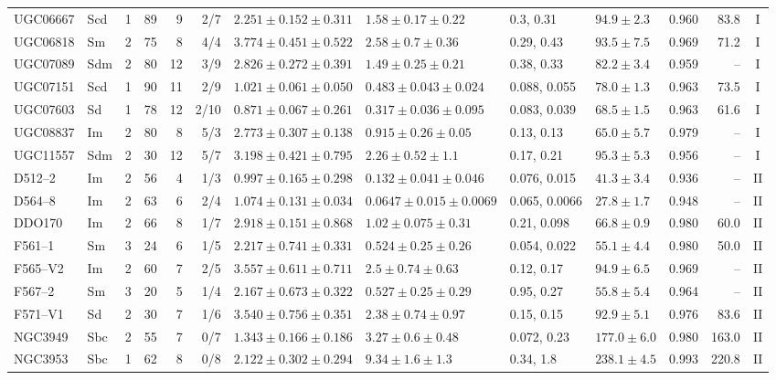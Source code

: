 \documentclass[10pt]{article}
\begin{document}
\begin{landscape}
{\begin{longtable}{llrrrrlllllrc}
UGC06667 & Scd & 1 & 89 & 9 & 2/7 & $2.251\pm0.152\pm0.311$ & $1.58\pm0.17\pm0.22$ & 0.3, 0.31 & $94.9\pm2.3$ & 0.960 & 83.8 & I\\
UGC06818 & Sm & 2 & 75 & 8 & 4/4 & $3.774\pm0.451\pm0.522$ & $2.58\pm0.7\pm0.36$ & 0.29, 0.43 & $93.5\pm7.5$ & 0.969 & 71.2 & I\\
UGC07089 & Sdm & 2 & 80 & 12 & 3/9 & $2.826\pm0.272\pm0.391$ & $1.49\pm0.25\pm0.21$ & 0.38, 0.33 & $82.2\pm3.4$ & 0.959 & -- & I\\
UGC07151 & Scd & 1 & 90 & 11 & 2/9 & $1.021\pm0.061\pm0.050$ & $0.483\pm0.043\pm0.024$ & 0.088, 0.055 & $78.0\pm1.3$ & 0.963 & 73.5 & I\\
UGC07603 & Sd & 1 & 78 & 12 & 2/10 & $0.871\pm0.067\pm0.261$ & $0.317\pm0.036\pm0.095$ & 0.083, 0.039 & $68.5\pm1.5$ & 0.963 & 61.6 & I\\
UGC08837 & Im & 2 & 80 & 8 & 5/3 & $2.773\pm0.307\pm0.138$ & $0.915\pm0.26\pm0.05$ & 0.13, 0.13 & $65.0\pm5.7$ & 0.979 & -- & I\\
UGC11557 & Sdm & 2 & 30 & 12 & 5/7 & $3.198\pm0.421\pm0.795$ & $2.26\pm0.52\pm1.1$ & 0.17, 0.21 & $95.3\pm5.3$ & 0.956 & -- & I\\
D512--2 & Im & 2 & 56 & 4 & 1/3 & $0.997\pm0.165\pm0.298$ & $0.132\pm0.041\pm0.046$ & 0.076, 0.015 & $41.3\pm3.4$ & 0.936 & -- & II\\
D564--8 & Im & 2 & 63 & 6 & 2/4 & $1.074\pm0.131\pm0.034$ & $0.0647\pm0.015\pm0.0069$ & 0.065, 0.0066 & $27.8\pm1.7$ & 0.948 & -- & II\\
DDO170 & Im & 2 & 66 & 8 & 1/7 & $2.918\pm0.151\pm0.868$ & $1.02\pm0.075\pm0.31$ & 0.21, 0.098 & $66.8\pm0.9$ & 0.980 & 60.0 & II\\
F561--1 & Sm & 3 & 24 & 6 & 1/5 & $2.217\pm0.741\pm0.331$ & $0.524\pm0.25\pm0.26$ & 0.054, 0.022 & $55.1\pm4.4$ & 0.980 & 50.0 & II\\
F565--V2 & Im & 2 & 60 & 7 & 2/5 & $3.557\pm0.611\pm0.711$ & $2.5\pm0.74\pm0.63$ & 0.12, 0.17 & $94.9\pm6.5$ & 0.969 & -- & II\\
F567--2 & Sm & 3 & 20 & 5 & 1/4 & $2.167\pm0.673\pm0.322$ & $0.527\pm0.25\pm0.29$ & 0.95, 0.27 & $55.8\pm5.4$ & 0.964 & -- & II\\
F571--V1 & Sd & 2 & 30 & 7 & 1/6 & $3.540\pm0.756\pm0.351$ & $2.38\pm0.74\pm0.97$ & 0.15, 0.15 & $92.9\pm5.1$ & 0.976 & 83.6 & II\\
NGC3949 & Sbc & 2 & 55 & 7 & 0/7 & $1.343\pm0.166\pm0.186$ & $3.27\pm0.6\pm0.48$ & 0.072, 0.23 & $177.0\pm6.0$ & 0.980 & 163.0 & II\\
NGC3953 & Sbc & 1 & 62 & 8 & 0/8 & $2.122\pm0.302\pm0.294$ & $9.34\pm1.6\pm1.3$ & 0.34, 1.8 & $238.1\pm4.5$ & 0.993 & 220.8 & II\\

\end{longtable}}
\end{landscape}
\end{document}

